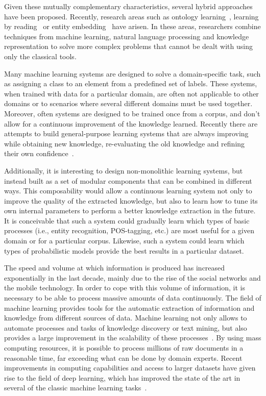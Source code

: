 Given these mutually complementary characteristics, several hybrid approaches have been proposed.
Recently, research areas such as ontology learning~\cite{cimiano2009ontology},
learning by reading~\cite{barker2007learning} or entity embedding~\cite{hu2015entity} have arisen.
In these areas, researchers combine techniques from machine learning, natural language
processing and knowledge representation to solve more complex problems that cannot
be dealt with using only the classical tools.

Many machine learning systems are designed to solve a domain-specific task, such as
assigning a class to an element from a predefined set of labels. These systems,
when trained with data for a particular domain, are often not applicable to other domains
or to scenarios where several different domains must be used together. Moreover,
often systems are designed to be trained once from a corpus, and don't allow for
a continuous improvement of the knowledge learned.
Recently there are attempts to build general-purpose learning systems that are always
improving while obtaining new knowledge, re-evaluating the old knowledge and refining their
own confidence~\cite{mitchell2015never}.

Additionally, it is interesting to design non-monolithic learning systems, but instead
built as a set of modular components that can be combined in different ways.
This composability would allow a continuous learning system not only to improve the
quality of the extracted knowledge, but also to learn how to tune its own internal
parameters to perform a better knowledge extraction in the future. It is conceivable
that such a system could gradually learn which types of basic processes (i.e., entity recognition, POS-tagging, etc.)
are most useful for a given domain or for a particular corpus. Likewise, such a system could
learn which types of probabilistic models provide the best results in a particular dataset.

  The speed and volume at which information is produced has increased exponentially in the last decade,
   mainly due to the rise of the social networks and the mobile technology. In order to cope with this volume of information,
   it is necessary to be able to process massive amounts of data continuously.
    The field of machine learning provides tools for the automatic extraction of information and knowledge from different
    sources of data.
    Machine learning not only allows to automate processes and tasks of knowledge discovery or text mining, but also provides a large
    improvement in the scalability of these processes~\cite{wu2014data}. By using mass computing resources, it is possible to process millions
    of raw documents in a reasonable time, far exceeding what can be done by domain experts.
    Recent improvements in computing capabilities and access to larger datasets have given rise
    to the field of deep learning, which has improved the state of the art in
    several of the classic machine learning tasks~\cite{lecun2015deep}.

